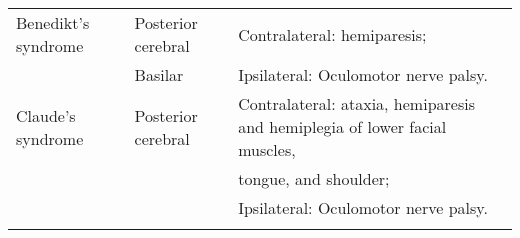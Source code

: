 \begin{landscape}
\begin{table}
\begin{tabular}{l | l | l}
\noalign{\smallskip}
\hline
\noalign{\smallskip}
Benedikt's syndrome & Posterior cerebral & Contralateral: hemiparesis;\\
& Basilar & Ipsilateral: Oculomotor nerve palsy.\\ 
\noalign{\smallskip}
\hline
\noalign{\smallskip}
Claude's syndrome & Posterior cerebral & Contralateral: ataxia, hemiparesis and hemiplegia of lower facial muscles,\\
& & tongue, and shoulder;\\
& & Ipsilateral: Oculomotor nerve palsy.\\
\noalign{\smallskip}
\bottomrule

\end{tabular} 
\end{table}

\normalsize

\end{landscape}
\newpage

